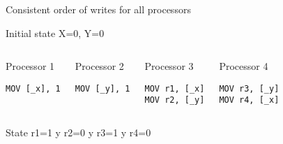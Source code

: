 \begin{frame}[t,fragile]{Consistent order of writes for all processors}

\begin{block}{Initial state}
X=0, Y=0
\end{block}


\begin{columns}[T]


\begin{block}{\small Processor 1}
\begin{lstlisting}[language={[x86masm]Assembler}]
MOV [_x], 1
\end{lstlisting}
\end{block}

\begin{block}{\small Processor 2}
\begin{lstlisting}[language={[x86masm]Assembler}]
MOV [_y], 1
\end{lstlisting}
\end{block}

\begin{block}{\small Processor 3}
\begin{lstlisting}[language={[x86masm]Assembler}]
MOV r1, [_x]
MOV r2, [_y]
\end{lstlisting}
\end{block}

\begin{block}{\small Processor 4}
\begin{lstlisting}[language={[x86masm]Assembler}]
MOV r3, [_y]
MOV r4, [_x]
\end{lstlisting}
\end{block}

\end{columns}


\begin{block}{State }
r1=1 y r2=0 y r3=1 y r4=0
\end{block}

\end{frame}



